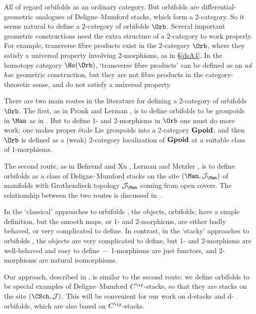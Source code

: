 \documentclass{article}
\begin{document}
All of \cite{ALR,ChRu,Sata,Thur,Moer,MoPr} regard orbifolds as an
ordinary category. But orbifolds are differential-geometric
analogues of Deligne--Mumford stacks, which form a
2-category. So it seems natural to define a 2-category
of orbifolds $\Orb$. Several important geometric constructions need
the extra structure of a 2-category to work properly. For example,
transverse fibre products exist in the 2-category
$\Orb$, where they satisfy a universal property involving
2-morphisms, as in \S\ref{dsA4}. In the homotopy category
$\Ho(\Orb)$,
`transverse fibre products' can be defined as an {\it ad hoc\/}
geometric construction, but they are not fibre products in the
category-theoretic sense, and do not satisfy a universal
property.

There are two main routes in the literature for defining a
2-category of orbifolds $\Orb$. The first, as in Pronk
\cite{Pron} and Lerman \cite[\S 3.3]{Lerm}, is to define orbifolds
to be groupoids in $\Man$ as in \cite{Moer,MoPr}. But to define 1-
and 2-morphisms in $\Orb$ one must do more work: one makes proper
\'etale Lie groupoids into a 2-category $\bf Gpoid$, and then $\Orb$
is defined as a (weak) 2-category localization of
$\bf Gpoid$ at a suitable class of 1-morphisms.

The second route, as in Behrend and Xu \cite[\S 2]{BeXu}, Lerman
\cite[\S 4]{Lerm} and Metzler \cite[\S 3.5]{Metz}, is to define
orbifolds as a class of Deligne--Mumford stacks on the site $(\Man,{\cal J}_\Man)$ of
manifolds with Grothendieck topology ${\cal
J}_\Man$ coming from open covers. The relationship between the two
routes is discussed in~\cite{BeXu,Lerm,Pron}.

In the `classical' approaches to orbifolds \cite{ALR,ChRu,Moer,
MoPr,Sata,Thur}, the objects, orbifolds, have a simple definition,
but the smooth maps, or 1- and 2-morphisms, are either badly
behaved, or very complicated to define. In contrast, in the `stacky'
approaches to orbifolds \cite{BeXu,Joyc4,Lerm,Metz}, the objects are
very complicated to define, but 1- and 2-morphisms are well-behaved
and easy to define --- 1-morphisms are just functors, and
2-morphisms are natural isomorphisms.

Our approach, described in \cite[\S 8.2]{Joyc6}, is similar to the
second route: we define orbifolds to be special examples of
Deligne--Mumford $C^\iy$-stacks, so that they are stacks on the site
$(\CSch,{\cal J})$. This will be convenient for our work on d-stacks
and d-orbifolds, which are also based on $C^\iy$-stacks.
\end{document}
